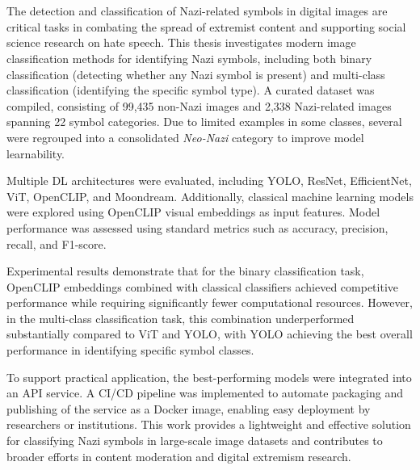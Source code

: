 \chapter{\abstractname}

The detection and classification of Nazi-related symbols in digital images are critical tasks in combating the
spread of extremist content and supporting social science research on hate speech. This thesis investigates modern
image classification methods for identifying Nazi symbols, including both binary classification (detecting whether
any Nazi symbol is present) and multi-class classification (identifying the specific symbol type). A curated dataset
was compiled, consisting of 99,435 non-Nazi images and 2,338 Nazi-related images spanning 22 symbol categories. Due
to limited examples in some classes, several were regrouped into a consolidated \textit{Neo-Nazi} category to
improve model learnability.

Multiple \ac{DL} architectures were evaluated, including \ac{YOLO}, \ac{ResNet}, EfficientNet, \ac{ViT},
OpenCLIP, and Moondream. Additionally, classical machine learning models were explored using
OpenCLIP visual embeddings as input features. Model performance was assessed using standard metrics such as
accuracy, precision, recall, and F1-score.

Experimental results demonstrate that for the binary classification task, OpenCLIP embeddings combined with
classical classifiers achieved competitive performance while requiring significantly fewer computational resources.
However, in the multi-class classification task, this combination underperformed substantially compared to \ac{ViT} and
\ac{YOLO}, with \ac{YOLO} achieving the best overall performance in identifying specific symbol classes.

To support practical application, the best-performing models were integrated into an \ac{API} service. A \ac{CI/CD}
pipeline was implemented to automate packaging and publishing of the service as a Docker image, enabling easy
deployment by researchers or institutions. This work provides a lightweight and effective solution for classifying
Nazi symbols in large-scale image datasets and contributes to broader efforts in content moderation and digital
extremism research.
